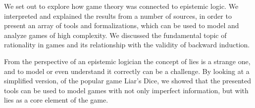 We set out to explore how game theory was connected to epistemic logic. We interpreted and explained the results from a number of sources, in order to present an array of tools and formalizations, which can be used to model and analyze games of high complexity. We discussed the fundamental topic of rationality in games and its relationship with the validity of backward induction.

From the perspective of an epistemic logician the concept of lies is a strange one, and to model or even understand it correctly can be a challenge. By looking at a simplified version, of the popular game Liar's Dice, we showed that the presented tools can be used to model games with not only imperfect information, but with lies as a core element of the game.